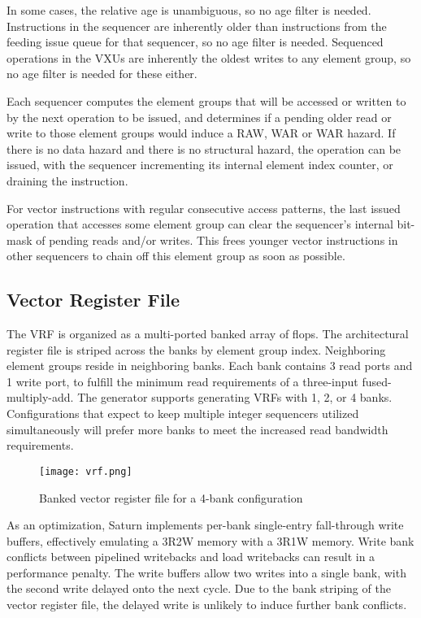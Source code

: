 In some cases, the relative age is unambiguous, so no age filter is needed.
Instructions in the sequencer are inherently older than instructions from the feeding issue queue for that sequencer, so no age filter is needed.
Sequenced operations in the VXUs are inherently the oldest writes to any element group, so no age filter is needed for these either.

Each sequencer computes the element groups that will be accessed or written to by the next operation to be issued, and determines if a pending older read or write to those element groups would induce a RAW, WAR or WAR hazard.
If there is no data hazard and there is no structural hazard, the operation can be issued, with the sequencer incrementing its internal element index counter, or draining the instruction.

For vector instructions with regular consecutive access patterns, the last issued operation that accesses some element group can clear the sequencer's internal bit-mask of pending reads and/or writes.
This frees younger vector instructions in other sequencers to chain off this element group as soon as possible.

\subsection{Vector Register File}

The VRF is organized as a multi-ported banked array of flops.
The architectural register file is striped across the banks by element group index.
Neighboring element groups reside in neighboring banks.
Each bank contains 3 read ports and 1 write port, to fulfill the minimum read requirements of a three-input fused-multiply-add.
The generator supports generating VRFs with 1, 2, or 4 banks.
Configurations that expect to keep multiple integer sequencers utilized simultaneously will prefer more banks to meet the increased read bandwidth requirements.


\begin{figure}[h]
  \centering
  \texttt{[image: vrf.png]}
  \caption{Banked vector register file for a 4-bank configuration}
  \label{fig:vrf}
\end{figure}


As an optimization, Saturn implements per-bank single-entry fall-through write buffers, effectively emulating a 3R2W memory with a 3R1W memory.
Write bank conflicts between pipelined writebacks and load writebacks can result in a performance penalty.
The write buffers allow two writes into a single bank, with the second write delayed onto the next cycle.
Due to the bank striping of the vector register file, the delayed write is unlikely to induce further bank conflicts.


